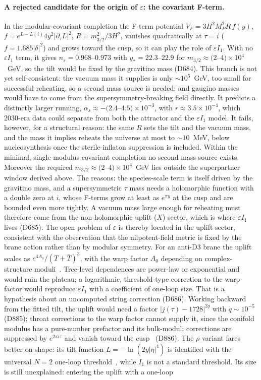 \documentclass[aps,prd,twocolumn,superscriptaddress,nofootinbib,floatfix]{revtex4-2}
\begin{document}
\paragraph{A rejected candidate for the origin of $\varepsilon$: the covariant F-term.} In the modular-covariant completion the F-term potential $V_F=3H^2M_P^2R\,f(y)$, $f=e^{L-L(i)}4y^2|\partial_\tau L|^2$, $R=m_{3/2}^2/3H^2$, vanishes quadratically at $\tau=i$ ($f=1.685|\delta|^2$) and grows toward the cusp, so it can play the role of $\varepsilon I_1$. With no $\varepsilon I_1$ term, it gives $n_s=0.968$--$0.973$ with $y_*=22.3$--$22.9$ for $m_{3/2}\approx(2$--$4)\times10^4$~GeV, so the tilt would be fixed by the gravitino mass (D684). This branch is not yet self-consistent: the vacuum mass it supplies is only $\sim10^5$~GeV, too small for successful reheating, so a second mass source is needed; and gaugino masses would have to come from the supersymmetry-breaking field directly. It predicts a distinctly larger running, $\alpha_s\approx-(2.4$--$4.5)\times10^{-3}$, with $r\approx3.5\times10^{-4}$, which 2030-era data could separate from both the attractor and the $\varepsilon I_1$ model. It fails, however, for a structural reason: the same $R$ sets the tilt and the vacuum mass, and the mass it implies reheats the universe at most to $\sim10$~MeV, below nucleosynthesis once the sterile-inflaton suppression is included. Within the minimal, single-modulus covariant completion no second mass source exists. Moreover the required $m_{3/2}\approx(2$--$4)\times10^4$~GeV lies outside the superpartner window derived above. The reasons: the species-scale term is itself driven by the gravitino mass, and a supersymmetric $\tau$ mass needs a holomorphic function with a double zero at $i$, whose F-terms grow at least as $e^{\pi y}$ at the cusp and are bounded even more tightly. A vacuum mass large enough for reheating must therefore come from the non-holomorphic uplift ($X$) sector, which is where $\varepsilon I_1$ lives (D685). The open problem of $\varepsilon$ is thereby located in the uplift sector, consistent with the observation that the nilpotent-field metric is fixed by the brane action rather than by modular symmetry. For an anti-D3 brane the uplift scales as $e^{4A_0}/(T+\bar T)^3$, with the warp factor $A_0$ depending on complex-structure moduli~\cite{arXiv_1707_07059}. Tree-level dependences are power-law or exponential and would ruin the plateau; a logarithmic, threshold-type correction to the warp factor would reproduce $\varepsilon I_1$ with a coefficient of one-loop size. That is a hypothesis about an uncomputed string correction (D686). Working backward from the fitted tilt, the uplift would need a factor $|j(\tau)-1728|^{2q}$ with $q\sim10^{-5}$ (D885); throat corrections to the warp factor cannot supply it, since the conifold modulus has a pure-number prefactor and its bulk-moduli corrections are suppressed by $e^{2\pi i\tau}$ and vanish toward the cusp~\cite{arXiv_2009_03312} (D886). The $\rho$ variant fares better on shape: its tilt function $L=-\ln(2y|\eta|^4)$ is identified with the universal $N=2$ one-loop threshold~\cite{DKL1991,arXiv_hep-th_9510182}, while $I_1$ is not a standard threshold. Its size is still unexplained: entering the uplift with a one-loop 
\end{document}
